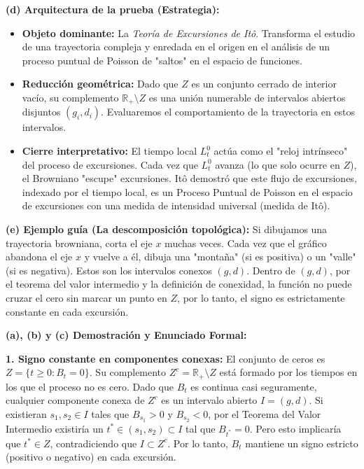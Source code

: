 \documentclass[11pt, letterpaper]{article}
\begin{document}
\begin{solucion}
    \textbf{(d) Arquitectura de la prueba (Estrategia):}
    \begin{itemize}
        \item[(i)] \textbf{Objeto dominante:} La \textit{Teoría de Excursiones de Itô}. Transforma el estudio de una trayectoria compleja y enredada en el origen en el análisis de un proceso puntual de Poisson de "saltos" en el espacio de funciones.
        \item[(ii)] \textbf{Reducción geométrica:} Dado que $Z$ es un conjunto cerrado de interior vacío, su complemento $\mathbb{R}_+ \setminus Z$ es una unión numerable de intervalos abiertos disjuntos $(g_i, d_i)$. Evaluaremos el comportamiento de la trayectoria en estos intervalos.
        \item[(iii)] \textbf{Cierre interpretativo:} El tiempo local $L_t^0$ actúa como el "reloj intrínseco" del proceso de excursiones. Cada vez que $L_t^0$ avanza (lo que solo ocurre en $Z$), el Browniano "escupe" excursiones. Itô demostró que este flujo de excursiones, indexado por el tiempo local, es un Proceso Puntual de Poisson en el espacio de excursiones con una medida de intensidad universal (medida de Itô).
    \end{itemize}

    \vspace{3mm}
    \textbf{(e) Ejemplo guía (La descomposición topológica):}
    Si dibujamos una trayectoria browniana, corta el eje $x$ muchas veces. Cada vez que el gráfico abandona el eje $x$ y vuelve a él, dibuja una "montaña" (si es positiva) o un "valle" (si es negativa). Estos son los intervalos conexos $(g, d)$. Dentro de $(g, d)$, por el teorema del valor intermedio y la definición de conexidad, la función no puede cruzar el cero sin marcar un punto en $Z$, por lo tanto, el signo es estrictamente constante en cada excursión.

    \textbf{(a), (b) y (c) Demostración y Enunciado Formal:}

    \textbf{1. Signo constante en componentes conexas:}
    El conjunto de ceros es $Z = \{t \ge 0 : B_t = 0\}$. Su complemento $Z^c = \mathbb{R}_+ \setminus Z$ está formado por los tiempos en los que el proceso no es cero.
    Dado que $B_t$ es continua casi seguramente, cualquier componente conexa de $Z^c$ es un intervalo abierto $I = (g, d)$. Si existieran $s_1, s_2 \in I$ tales que $B_{s_1} > 0$ y $B_{s_2} < 0$, por el Teorema del Valor Intermedio existiría un $t^* \in (s_1, s_2) \subset I$ tal que $B_{t^*} = 0$. Pero esto implicaría que $t^* \in Z$, contradiciendo que $I \subset Z^c$. Por lo tanto, $B_t$ mantiene un signo estricto (positivo o negativo) en cada excursión.


\end{solucion}
\end{document}
